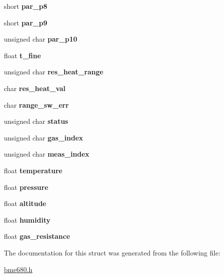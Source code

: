\begin{DoxyCompactItemize}
short {\bfseries par\+\_\+p8}
\item 
\mbox{\label{structbme680__st_a6127218a0abcb6994f0c06e36677c408}} 
short {\bfseries par\+\_\+p9}
\item 
\mbox{\label{structbme680__st_a9d2fc72f99952d6795a0fa5e5966c40a}} 
unsigned char {\bfseries par\+\_\+p10}
\item 
\mbox{\label{structbme680__st_a91b4aee4a1bcfecc2cdc429f536f984f}} 
float {\bfseries t\+\_\+fine}
\item 
\mbox{\label{structbme680__st_a74fb4ed972b53cd447efed5e287ff323}} 
unsigned char {\bfseries res\+\_\+heat\+\_\+range}
\item 
\mbox{\label{structbme680__st_ae47fb583fddc15cb930f34dd3ea9d576}} 
char {\bfseries res\+\_\+heat\+\_\+val}
\item 
\mbox{\label{structbme680__st_a9913bfe65800a30944c82ffa3612ad0a}} 
char {\bfseries range\+\_\+sw\+\_\+err}
\item 
\mbox{\label{structbme680__st_a54849a1c58ce64ba16a055ad9555a027}} 
unsigned char {\bfseries status}
\item 
\mbox{\label{structbme680__st_a2cfeca63ee4a4aa9c68c656f3c2af0f6}} 
unsigned char {\bfseries gas\+\_\+index}
\item 
\mbox{\label{structbme680__st_ad24c8356f33a47b13291667a39bc2fe4}} 
unsigned char {\bfseries meas\+\_\+index}
\item 
\mbox{\label{structbme680__st_afc1d28cfbce795d6ea954ebe725241f5}} 
float {\bfseries temperature}
\item 
\mbox{\label{structbme680__st_ac870e1249bab4a2a68cc4126761d24ef}} 
float {\bfseries pressure}
\item 
\mbox{\label{structbme680__st_a0e13a4b4ae0cefdac2a413284239caa6}} 
float {\bfseries altitude}
\item 
\mbox{\label{structbme680__st_a6a87b2b0cff24d38b367ccd34843a206}} 
float {\bfseries humidity}
\item 
\mbox{\label{structbme680__st_ac30cebc4cd86ec13a739515a74105b50}} 
float {\bfseries gas\+\_\+resistance}
\end{DoxyCompactItemize}


The documentation for this struct was generated from the following file\+:\begin{DoxyCompactItemize}
\item 
\mbox{\hyperlink{bme680_8h}{bme680.\+h}}\end{DoxyCompactItemize}
